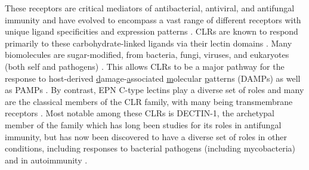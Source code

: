 These receptors are critical mediators of antibacterial, antiviral, and antifungal immunity and have evolved to encompass a vast range of different receptors with unique ligand specificities and expression patterns \citep{Hoving2014, Tang2018}. CLRs are known to respond primarily to these carbohydrate\hyp{}linked ligands via their lectin domains \citep{McGreal2005, Dodd2001}. Many biomolecules are sugar\hyp{}modified, from bacteria, fungi, viruses, and eukaryotes (both self and pathogens) \citep{Rudd2001, Ohtsubo2006}. This allows CLRs to be a major pathway for the response to host\hyp{}derived \underline{d}amage\hyp{}\underline{a}ssociated \underline{m}olecular \underline{p}atterns (DAMPs) as well as PAMPs \citep{GarciaVallejo2009}. By contrast, EPN C\hyp{}type lectins play a diverse set of roles and many are the classical members of the CLR family, with many being transmembrane receptors \citep{Sancho2012}. Most notable among these CLRs is DECTIN\hyp{}1, the archetypal member of the family which has long been studies for its roles in antifungal immunity, but has now been discovered to have a diverse set of roles in other conditions, including responses to bacterial pathogens (including mycobacteria) and in autoimmunity \citep{Brown2002, Brown2003, Brown2006, Reid2009, Drummond2011b, Schorey2008, Yadav2006, Wagener2018, Deerhake2021}. 

